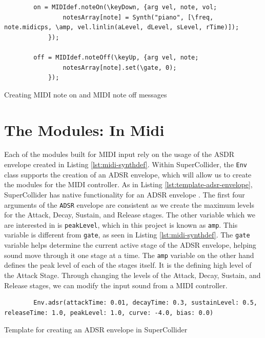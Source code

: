 \begin{listing}
	\begin{lstlisting}
		on = MIDIdef.noteOn(\keyDown, {arg vel, note, vol;
				notesArray[note] = Synth("piano", [\freq, note.midicps, \amp, vel.linlin(aLevel, dLevel, sLevel, rTime)]);
			});

		off = MIDIdef.noteOff(\keyUp, {arg vel, note;
				notesArray[note].set(\gate, 0);
			});
	\end{lstlisting}
	\caption{Creating MIDI note on and MIDI note off messages}
	\label{lst:midi-note-on-and-off}	
\end{listing}


\section{The Modules: In Midi}\label{section:the-modules-midi}

Each of the modules built for MIDI input rely on the usage of the ASDR envelope created in Listing \ref{lst:midi-synthdef}. Within SuperCollider, the \texttt{Env} class supports the creation of an ADSR envelope, which will allow us to create the modules for the MIDI controller. As in Listing \ref{lst:template-adsr-envelope}, SuperCollider has native functionality for an ADSR envelope \cite{McCartney_2021}. The first four arguments of the \texttt{ADSR} envelope are consistent as we create the maximum levels for the Attack, Decay, Sustain, and Release stages. The other variable which we are interested in is \texttt{peakLevel}, which in this project is known as \texttt{amp}. This variable is different from \texttt{gate}, as seen in Listing \ref{lst:midi-synthdef}. The \texttt{gate} variable helps determine the current active stage of the ADSR envelope, helping sound move through it one stage at a time. The \texttt{amp} variable on the other hand defines the peak level of each of the stages itself. It is the defining high level of the Attack Stage. Through changing the levels of the Attack, Decay, Sustain, and Release stages, we can modify the input sound from a MIDI controller. 

\begin{listing}
	\begin{lstlisting}
		Env.adsr(attackTime: 0.01, decayTime: 0.3, sustainLevel: 0.5, releaseTime: 1.0, peakLevel: 1.0, curve: -4.0, bias: 0.0)
	\end{lstlisting}	
	\caption{Template for creating an ADSR envelope in SuperCollider}
	\label{lst:template-adsr-envelope}
\end{listing}


